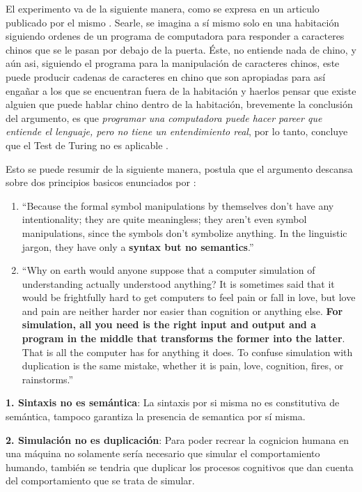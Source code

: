 \documentclass{article}
\begin{document}
El experimento va de la siguiente manera, como se expresa en un articulo publicado por el mismo \cite{searle1980}. Searle, se imagina a s\'i mismo solo en una habitaci\'on siguiendo ordenes de un programa de computadora para responder a caracteres chinos que se le pasan por debajo de la puerta. \'Este, no entiende nada de chino, y a\'un asi, siguiendo el programa para la manipulaci\'on de caracteres chinos, este puede producir cadenas de caracteres en chino que son apropiadas para as\'i enga\~nar a los que se encuentran fuera de la habitaci\'on y haerlos pensar que existe alguien que puede hablar chino dentro de la habitaci\'on, brevemente la conclusi\'on del argumento, es que \textit{programar una computadora puede hacer pareer que entiende el lenguaje, pero no tiene un entendimiento real}, por lo tanto, concluye que el Test de Turing no es aplicable \cite{cole2014}.

Esto se puede resumir de la siguiente manera, \cite{searle2009} postula que el argumento descansa sobre dos principios basicos enunciados por \cite{searle1980}:
\begin{enumerate}
\item ``Because the formal symbol manipulations by themselves don't have any intentionality; they are quite meaningless; they aren't even symbol manipulations, since the symbols don't symbolize anything. In the linguistic jargon, they have only a \textbf{syntax but no semantics}.''
\item ``Why on earth would anyone suppose that a computer simulation of understanding actually understood anything? It is sometimes said that it would be frightfully hard to get computers to feel pain or fall in love, but love and pain are neither harder nor easier than cognition or anything else. \textbf{For simulation, all you need is the right input and output and a program in the middle that transforms the former into the latter}. That is all the computer has for anything it does. To confuse simulation with duplication is the same mistake, whether it is pain, love, cognition, fires, or rainstorms.''
\end{enumerate}

\textbf{1. Sintaxis no es sem\'antica}: La sintaxis por si misma no es constitutiva de sem\'antica, tampoco garantiza la presencia de semantica por s\'i misma.

\textbf{2. Simulaci\'on no es duplicaci\'on}: Para poder recrear la cognicion humana en una m\'aquina no solamente ser\'ia necesario que simular el comportamiento humando, tambi\'en se tendria que duplicar los procesos cognitivos que dan cuenta del comportamiento que se trata de simular.
\end{document}
